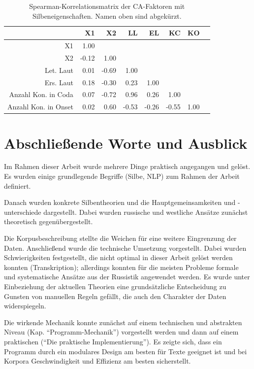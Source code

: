 \documentclass[12pt,headsepline,a4paper]{scrartcl}
\begin{document}
\begin{table}
\centering
\caption{Spearman-Korrelationsmatrix der CA-Faktoren mit Silbeneigenschaften. Namen oben sind abgekürzt.}
\label{tab: cor_mat}
\begin{tabular}{r|rrrrrrr}
\toprule
{} &         X1 &         X2 &   LL&  EL&      KC&     KO\\
\midrule
X1        &       1.00 &  &&&&\\
X2        &      -0.12 &       1.00 &      &&&\\
Let. Laut&       0.01 &      -0.69 &       1.00 &       &&\\
Ers. Laut&       0.18 &      -0.30 &       0.23 &       1.00 &       &\\
Anzahl Kon. in Coda    &       0.07 &      -0.72 &       0.96 &       0.26 &       1.00 &      \\
Anzahl Kon. in Onset&       0.02 &       0.60 &      -0.53 &      -0.26 &      -0.55 &       1.00 \\
\bottomrule
\end{tabular}
\end{table}
\newpage

\section*{Abschließende Worte und Ausblick}

Im Rahmen dieser Arbeit wurde mehrere Dinge praktisch angegangen und gelöst. Es wurden einige grundlegende Begriffe (Silbe, NLP) zum Rahmen der Arbeit definiert.

Danach wurden konkrete Silbentheorien und die Hauptgemeinsamkeiten und -unterschiede dargestellt. Dabei wurden russische und westliche Ansätze zunächst theoretisch gegenübergestellt. 

Die Korpusbeschreibung stellte die Weichen für eine weitere Eingrenzung der Daten. Anschließend wurde die technische Umsetzung vorgestellt. Dabei wurden Schwierigkeiten festgestellt, die nicht optimal in dieser Arbeit gelöst werden konnten (Transkription); allerdings konnten für die meisten Probleme formale und systematische Ansätze aus der Russistik angewendet werden. Es wurde unter Einbeziehung der aktuellen Theorien eine grundsätzliche Entscheidung zu Gunsten von manuellen Regeln gefällt, die auch den Charakter der Daten widerspiegeln.

Die wirkende Mechanik konnte zunächst auf einem technischen und abstrakten Niveau  (Kap. "`Programm-Mechanik"') vorgestellt werden und dann auf einem praktischen ("`Die praktische Implementierung"'). Es zeigte sich, dass ein Programm durch ein modulares Design am besten für Texte geeignet ist und bei Korpora Geschwindigkeit und Effizienz am besten sicherstellt.
\end{document}

